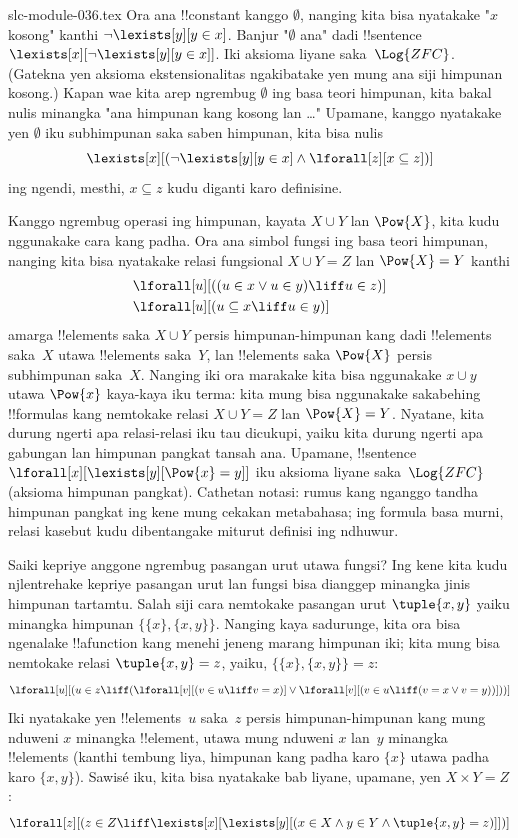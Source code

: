 \begin{filecontents*}[overwrite]{slc-module-036.tex}
Ora ana !!{constant} kanggo $\emptyset$, nanging
kita bisa nyatakake "$x$ kosong" kanthi
$\lnot \lexists[y][y \in x]$. Banjur
"$\emptyset$ ana" dadi !!{sentence}~
$\lexists[x][\lnot \lexists[y][y \in
    x]]$. Iki aksioma liyane saka~$\Log{ZFC}$.
(Gatekna yen aksioma ekstensionalitas ngakibatake
yen mung ana siji himpunan kosong.) Kapan wae
kita arep ngrembug $\emptyset$ ing basa teori
himpunan, kita bakal nulis minangka "ana
himpunan kang kosong lan \dots" Upamane,
kanggo nyatakake yen $\emptyset$ iku
subhimpunan saka saben himpunan, kita bisa nulis
\[
\lexists[x][(\lnot\lexists[y][y \in x] \land \lforall[z][x \subseteq
    z])]
\]
ing ngendi, mesthi, $x \subseteq z$ kudu diganti
karo definisine.

Kanggo ngrembug operasi ing himpunan, kayata
$X \cup Y$ lan $\Pow{X}$, kita kudu nggunakake
cara kang padha. Ora ana simbol fungsi ing basa
teori himpunan, nanging kita bisa nyatakake relasi
fungsional $X \cup Y = Z$ lan $\Pow{X} = Y$ kanthi
\begin{align*}
& \lforall[u][((u \in x \lor u \in y) \liff u \in z)]\\
& \lforall[u][(u \subseteq x \liff u \in y )]
\end{align*}
amarga !!{element}s saka $X \cup Y$ persis
himpunan-himpunan kang dadi !!{element}s saka~$X$
utawa !!{element}s saka~$Y$, lan
!!{element}s saka $\Pow{X}$ persis subhimpunan
saka~$X$. Nanging iki ora marakake kita bisa
nggunakake $x \cup y$ utawa $\Pow{x}$ kaya-kaya
iku terma: kita mung bisa nggunakake sakabehing
!!{formula}s kang nemtokake relasi
$X \cup Y = Z$ lan $\Pow{X} = Y$. Nyatane,
kita durung ngerti apa relasi-relasi iku tau
dicukupi, yaiku kita durung ngerti apa gabungan
lan himpunan pangkat tansah ana. Upamane,
!!{sentence} $\lforall[x][\lexists[y][\Pow{x} = y]]$
iku aksioma liyane saka~$\Log{ZFC}$
(aksioma himpunan pangkat).
Cathetan notasi: rumus kang nganggo tandha himpunan
pangkat ing kene mung cekakan metabahasa; ing formula
basa murni, relasi kasebut kudu dibentangake miturut
definisi ing ndhuwur.

Saiki kepriye anggone ngrembug pasangan urut
utawa fungsi? Ing kene kita kudu njlentrehake
kepriye pasangan urut lan fungsi bisa dianggep
minangka jinis himpunan tartamtu. Salah siji cara
nemtokake pasangan urut $\tuple{x, y}$ yaiku
minangka himpunan $\{\{x\}, \{x, y\}\}$.
Nanging kaya sadurunge, kita ora bisa ngenalake
!!a{function} kang menehi jeneng marang
himpunan iki; kita mung bisa nemtokake relasi
$\tuple{x, y} = z$, yaiku,
$\{\{x\}, \{x, y\}\} = z$:
\[
\lforall[u][(u \in z \liff (\lforall[v][(v \in u \liff v = x)] \lor
  \lforall[v][(v \in u \liff (v = x \lor v = y))]))]
\]
Iki nyatakake yen !!{element}s~$u$ saka~$z$
persis himpunan-himpunan kang mung nduweni $x$
minangka !!{element}, utawa mung nduweni $x$
lan~$y$ minangka !!{element}s (kanthi tembung liya,
himpunan kang padha karo $\{x\}$ utawa
padha karo $\{x, y\}$). Sawisé iku, kita bisa
nyatakake bab liyane, upamane, yen $X \times Y = Z$:
\[
\lforall[z][(z \in Z \liff \lexists[x][\lexists[y][(x \in
        X \land y \in Y \land \tuple{x, y} = z)]])]
\]


\end{filecontents*}
